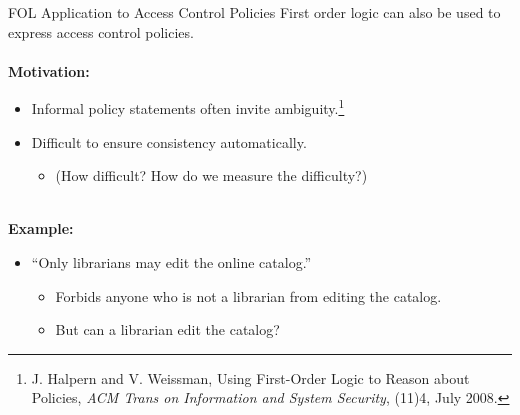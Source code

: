 \begin{wideslide}[bm=,toc=]{FOL Application to Access Control Policies}
First order logic can also be used to express access control policies.
\\~\\
\pause
\textbf{Motivation:} 
\begin{itemize}
\item Informal policy statements often invite ambiguity.\footnote{ \footnotesize
J. Halpern and V. Weissman, 
Using First-Order Logic to Reason about Policies, {\em ACM Trans on Information and System Security\/},
(11)4, July 2008.}
\item Difficult to ensure consistency automatically. \pause
\begin{itemize}
\item (How difficult? How do we measure the difficulty?) 
\end{itemize}
\end{itemize}
\pause
~\\
\textbf{Example:} 
\begin{itemize}
\item ``Only librarians may edit the online catalog.''
\begin{itemize}
\item<5-> Forbids anyone who is not a librarian from editing the catalog.
\item<6-> But can a librarian edit the catalog?
\end{itemize}
\end{itemize}
\end{wideslide}

